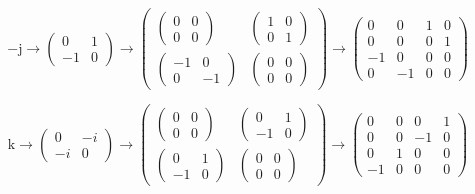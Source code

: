 \documentclass[
]{book}
\theoremstyle{definition}
\theoremstyle{definition}
\theoremstyle{definition}
\theoremstyle{definition}
\theoremstyle{remark}
\begin{document}
\[
-\mathrm{j}\rightarrow\begin{pmatrix}0 & 1\\
-1 & 0
\end{pmatrix}\rightarrow\begin{pmatrix}\begin{pmatrix}0 & 0\\
0 & 0
\end{pmatrix} & \begin{pmatrix}1 & 0\\
0 & 1
\end{pmatrix}\\
\begin{pmatrix}-1 & 0\\
0 & -1
\end{pmatrix} & \begin{pmatrix}0 & 0\\
0 & 0
\end{pmatrix}
\end{pmatrix}\rightarrow\begin{pmatrix}0 & 0 & 1 & 0\\
0 & 0 & 0 & 1\\
-1 & 0 & 0 & 0\\
0 & -1 & 0 & 0
\end{pmatrix}
\]

\[
\mathrm{k}\rightarrow\begin{pmatrix}0 & -i\\
-i & 0
\end{pmatrix}\rightarrow\begin{pmatrix}\begin{pmatrix}0 & 0\\
0 & 0
\end{pmatrix} & \begin{pmatrix}0 & 1\\
-1 & 0
\end{pmatrix}\\
\begin{pmatrix}0 & 1\\
-1 & 0
\end{pmatrix} & \begin{pmatrix}0 & 0\\
0 & 0
\end{pmatrix}
\end{pmatrix}\rightarrow\begin{pmatrix}0 & 0 & 0 & 1\\
0 & 0 & -1 & 0\\
0 & 1 & 0 & 0\\
-1 & 0 & 0 & 0
\end{pmatrix}
\]
\end{document}
